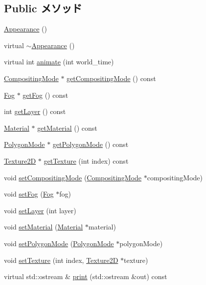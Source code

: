 \subsection*{Public メソッド}
\begin{CompactItemize}
\item 
\hyperlink{classm3g_1_1Appearance_2e594c7b96cb5cfad839a98b57f5d42f}{Appearance} ()
\item 
virtual \hyperlink{classm3g_1_1Appearance_c05c93d7a0f286cb9471b6c667ffeee1}{$\sim$Appearance} ()
\item 
virtual int \hyperlink{classm3g_1_1Appearance_8aad1ceab4c2a03609c8a42324ce484d}{animate} (int world\_\-time)
\item 
\hyperlink{classm3g_1_1CompositingMode}{CompositingMode} $\ast$ \hyperlink{classm3g_1_1Appearance_e4045934febb56891c15e14486b239a8}{getCompositingMode} () const 
\item 
\hyperlink{classm3g_1_1Fog}{Fog} $\ast$ \hyperlink{classm3g_1_1Appearance_93143a921b998ff69576147a59eb44d4}{getFog} () const 
\item 
int \hyperlink{classm3g_1_1Appearance_df831e0e0ebf9d7e997150e497e6a6cf}{getLayer} () const 
\item 
\hyperlink{classm3g_1_1Material}{Material} $\ast$ \hyperlink{classm3g_1_1Appearance_a412c7074ed5d51f6b8b6fd89275c405}{getMaterial} () const 
\item 
\hyperlink{classm3g_1_1PolygonMode}{PolygonMode} $\ast$ \hyperlink{classm3g_1_1Appearance_dd3ddcefcd18339150d281b155602886}{getPolygonMode} () const 
\item 
\hyperlink{classm3g_1_1Texture2D}{Texture2D} $\ast$ \hyperlink{classm3g_1_1Appearance_987cc21bd78d0e4e664da717479bdd57}{getTexture} (int index) const 
\item 
void \hyperlink{classm3g_1_1Appearance_b4dbfc0232132aeb0a7b7c5eaade82e1}{setCompositingMode} (\hyperlink{classm3g_1_1CompositingMode}{CompositingMode} $\ast$compositingMode)
\item 
void \hyperlink{classm3g_1_1Appearance_bc1a612006d6b4c3d443ff6ab542c788}{setFog} (\hyperlink{classm3g_1_1Fog}{Fog} $\ast$fog)
\item 
void \hyperlink{classm3g_1_1Appearance_fbd2fbd594c8ee140b028f505631f682}{setLayer} (int layer)
\item 
void \hyperlink{classm3g_1_1Appearance_1dfd1a55fa3cc625719dab8e95c8a2de}{setMaterial} (\hyperlink{classm3g_1_1Material}{Material} $\ast$material)
\item 
void \hyperlink{classm3g_1_1Appearance_cc21fac7868e2ad37e689ac642db1aae}{setPolygonMode} (\hyperlink{classm3g_1_1PolygonMode}{PolygonMode} $\ast$polygonMode)
\item 
void \hyperlink{classm3g_1_1Appearance_493e54b1c7ab839b9e76b28e0629cf6a}{setTexture} (int index, \hyperlink{classm3g_1_1Texture2D}{Texture2D} $\ast$texture)
\item 
virtual std::ostream \& \hyperlink{classm3g_1_1Appearance_6fea17fa1532df3794f8cb39cb4f911f}{print} (std::ostream \&out) const 
\end{CompactItemize}

